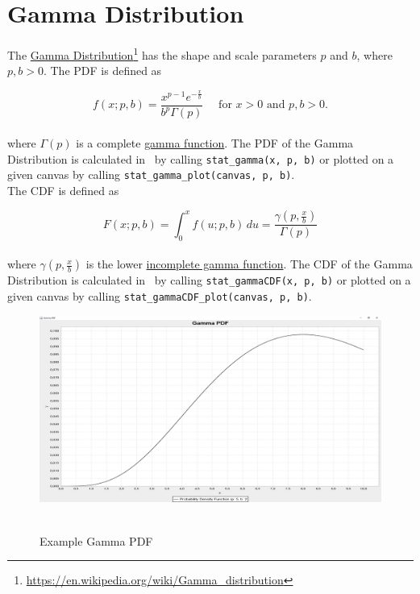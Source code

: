 	\section{Gamma Distribution}\label{sec:gamma_distribution}

		The \href{https://en.wikipedia.org/wiki/Gamma_distribution}{Gamma Distribution}\footnote{\url{https://en.wikipedia.org/wiki/Gamma_distribution}} has the shape and scale parameters $p$ and $b$, where $p,b > 0$. The \ac{PDF} is defined as

		$$f(x;p,b) =  \frac{x^{p-1}e^{-\frac{x}{b}}}{b^p\Gamma(p)} \quad \text{ for } x > 0 \text{ and } p, b > 0.$$
		\\[0.3cm]
		where $\Gamma(p)$ is a complete \href{https://en.wikipedia.org/wiki/Gamma_function}{gamma function}. The \ac{PDF} of the Gamma Distribution is calculated in \setlx\ by calling \lstinline{stat_gamma(x, p, b)} or plotted on a given canvas by calling \lstinline{stat_gamma_plot(canvas, p, b)}.
		\\[0.3cm]
		The \ac{CDF} is defined as

		$$F(x;p,b) = \int_0^x f(u;p,b)\,du = \frac{\gamma\left(p, \frac{x}{b}\right)}{\Gamma(p)}$$
		\\[0.3cm]
		where $\gamma\left(p, \frac{x}{b}\right)$ is the lower \href{https://en.wikipedia.org/wiki/Incomplete_gamma_function}{incomplete gamma function}. The \ac{CDF} of the Gamma Distribution is calculated in \setlx\ by calling \lstinline{stat_gammaCDF(x, p, b)} or plotted on a given canvas by calling \lstinline{stat_gammaCDF_plot(canvas, p, b)}.

		\begin{figure}[H]
			\centering
			\includegraphics[width=1\textwidth]{Figures/implemented_functions/gamma_pdf}~\\
			\caption{Example Gamma PDF}
			\label{fig:gamma_pdf}
		\end{figure}


